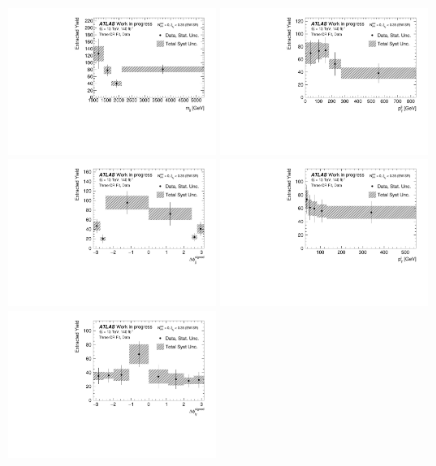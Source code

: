 \begin{figure}[t]
  \centering
  \includegraphics[width=0.49\textwidth]{plots/diffx/final/data/3cr/Extracted_Yield_data_mjj_3cr_QCD_Sh2211_0p01sigma}
  \includegraphics[width=0.49\textwidth]{plots/diffx/final/data/3cr/Extracted_Yield_data_jj_pt_3cr_QCD_Sh2211_0p01sigma}
  \includegraphics[width=0.49\textwidth]{plots/diffx/final/data/3cr/Extracted_Yield_data_jj_dphi_3cr_QCD_Sh2211_0p01sigma}
  \includegraphics[width=0.49\textwidth]{plots/diffx/final/data/3cr/Extracted_Yield_data_lep_pt_3cr_QCD_Sh2211_0p01sigma}
  \includegraphics[width=0.49\textwidth]{plots/diffx/final/data/3cr/Extracted_Yield_data_lepgam_dphi_3cr_QCD_Sh2211_0p01sigma}

\end{figure}
